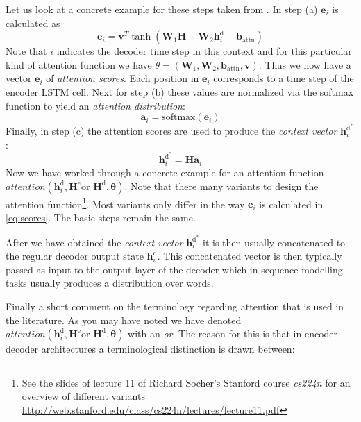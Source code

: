 \documentclass[11pt]{article}
\theoremstyle{definition}
\begin{document}
Let us look at a concrete example for these steps taken from \cite{see_get_2017}. In step (a) $\mathbf{e}_i$ is calculated as
\begin{equation}
	\mathbf{e}_i = \mathbf{v}^T\tanh(\mathbf{W}_1\mathbf{H} + \mathbf{W}_2 \mathbf{h}^{\text{d}}_i + \mathbf{b}_{\text{attn}})
	\label{eq:scores}
\end{equation}
Note that $i$ indicates the decoder time step in this context and for this particular kind of attention function we have $\theta = (\mathbf{W}_1,  \mathbf{W}_2, \mathbf{b}_{\text{attn}}, \mathbf{v})$. Thus we now have a vector $\mathbf{e}_i$ of \textit{attention scores}. Each position in $\mathbf{e}_i$ corresponds to a time step of the encoder LSTM cell. Next for step (b) these values are normalized via the softmax function to yield an \textit{attention distribution}:
\begin{equation}
	\mathbf{a}_i = \text{softmax}(\mathbf{e}_i)
	\label{eq:dist}
\end{equation}
Finally, in step (c) the attention scores are used to produce the \textit{context vector} $\mathbf{h}^{\text{d}^*}_i$:
\begin{equation}
	\mathbf{h}^{\text{d}^*}_i = \mathbf{H}\mathbf{a}_i
	\label{eq:context}
\end{equation}
Now we have worked through a concrete example for an attention function $attention(\mathbf{h}^{\text{d}}_i, \mathbf{H}^{\text{e}} \text{or } \mathbf{H}^{\text{d}}, \mathbf{\theta})$. Note that there many variants to design the attention function\footnote{See the slides of lecture 11 of Richard Socher's Stanford course \textit{cs224n} for an overview of different variants \url{http://web.stanford.edu/class/cs224n/lectures/lecture11.pdf}}. Most variants only differ in the way $\mathbf{e}_i$ is calculated in \autoref{eq:scores}. The basic steps remain the same. 
\par 
After we have obtained the \textit{context vector} $\mathbf{h}^{\text{d}^*}_i$ it is then usually concatenated to the regular decoder output state $\mathbf{h}^{\text{d}}_i$. This concatenated vector is then typically passed as input to the output layer of the decoder which in sequence modelling tasks usually produces a distribution over words.
\par
Finally a short comment on the terminology regarding attention that is used in the literature. As you may have noted we have denoted  $attention(\mathbf{h}^{\text{d}}_i, \mathbf{H}^{\text{e}} \text{or } \mathbf{H}^{\text{d}}, \mathbf{\theta})$ with an \textit{or}. The reason for this is that in encoder-decoder architectures a terminological distinction is drawn between:
\end{document}
